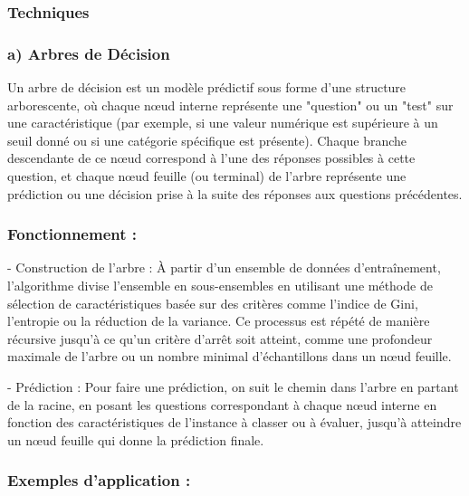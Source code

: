\documentclass[a4paper,12pt]{report}
\begin{document}
        \subsubsection*{Techniques}

        \subsubsection*{a) Arbres de Décision}

            Un arbre de décision est un modèle prédictif sous forme d'une structure arborescente, où chaque nœud interne représente une "question" ou un "test" sur une caractéristique (par exemple, si une valeur numérique est supérieure à un seuil donné ou si une catégorie spécifique est présente). Chaque branche descendante de ce nœud correspond à l'une des réponses possibles à cette question, et chaque nœud feuille (ou terminal) de l'arbre représente une prédiction ou une décision prise à la suite des réponses aux questions précédentes. 
             \subsubsection{Fonctionnement :}
            - Construction de l'arbre : À partir d'un ensemble de données d'entraînement, l'algorithme divise l'ensemble en sous-ensembles en utilisant une méthode de sélection de caractéristiques basée sur des critères comme l'indice de Gini, l'entropie ou la réduction de la variance. Ce processus est répété de manière récursive jusqu'à ce qu'un critère d'arrêt soit atteint, comme une profondeur maximale de l'arbre ou un nombre minimal d'échantillons dans un nœud feuille.
            
            - Prédiction : Pour faire une prédiction, on suit le chemin dans l'arbre en partant de la racine, en posant les questions correspondant à chaque nœud interne en fonction des caractéristiques de l'instance à classer ou à évaluer, jusqu'à atteindre un nœud feuille qui donne la prédiction finale.
            
            \subsubsection{ Exemples d'application :}
\end{document}
